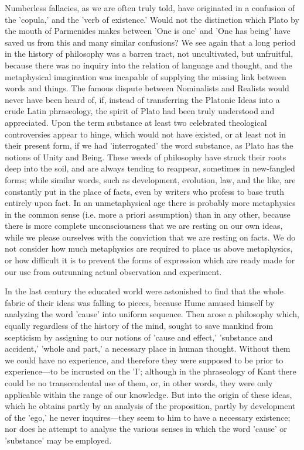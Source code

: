 \documentclass[11pt,letter]{article}
\begin{document}
\par  Numberless fallacies, as we are often truly told, have originated in a confusion of the 'copula,' and the 'verb of existence.' Would not the distinction which Plato by the mouth of Parmenides makes between 'One is one' and 'One has being' have saved us from this and many similar confusions? We see again that a long period in the history of philosophy was a barren tract, not uncultivated, but unfruitful, because there was no inquiry into the relation of language and thought, and the metaphysical imagination was incapable of supplying the missing link between words and things. The famous dispute between Nominalists and Realists would never have been heard of, if, instead of transferring the Platonic Ideas into a crude Latin phraseology, the spirit of Plato had been truly understood and appreciated. Upon the term substance at least two celebrated theological controversies appear to hinge, which would not have existed, or at least not in their present form, if we had 'interrogated' the word substance, as Plato has the notions of Unity and Being. These weeds of philosophy have struck their roots deep into the soil, and are always tending to reappear, sometimes in new-fangled forms; while similar words, such as development, evolution, law, and the like, are constantly put in the place of facts, even by writers who profess to base truth entirely upon fact. In an unmetaphysical age there is probably more metaphysics in the common sense (i.e. more a priori assumption) than in any other, because there is more complete unconsciousness that we are resting on our own ideas, while we please ourselves with the conviction that we are resting on facts. We do not consider how much metaphysics are required to place us above metaphysics, or how difficult it is to prevent the forms of expression which are ready made for our use from outrunning actual observation and experiment.

\par  In the last century the educated world were astonished to find that the whole fabric of their ideas was falling to pieces, because Hume amused himself by analyzing the word 'cause' into uniform sequence. Then arose a philosophy which, equally regardless of the history of the mind, sought to save mankind from scepticism by assigning to our notions of 'cause and effect,' 'substance and accident,' 'whole and part,' a necessary place in human thought. Without them we could have no experience, and therefore they were supposed to be prior to experience—to be incrusted on the 'I'; although in the phraseology of Kant there could be no transcendental use of them, or, in other words, they were only applicable within the range of our knowledge. But into the origin of these ideas, which he obtains partly by an analysis of the proposition, partly by development of the 'ego,' he never inquires—they seem to him to have a necessary existence; nor does he attempt to analyse the various senses in which the word 'cause' or 'substance' may be employed.
\end{document}
